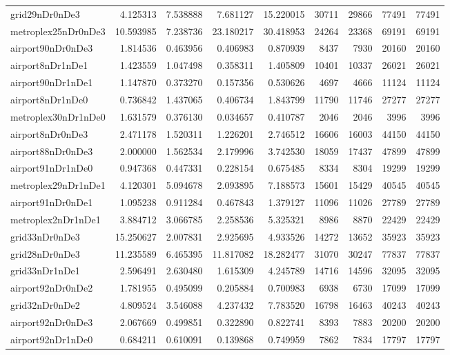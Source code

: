 \begin{longtable}{|l|r|r|r|r|r|r|r|r|}
grid29nDr0nDe3 & 4.125313 & 7.538888 & 7.681127 & 15.220015 & 30711 & 29866 & 77491 & 77491 \\
metroplex25nDr0nDe3 & 10.593985 & 7.238736 & 23.180217 & 30.418953 & 24264 & 23368 & 69191 & 69191 \\
airport90nDr0nDe3 & 1.814536 & 0.463956 & 0.406983 & 0.870939 & 8437 & 7930 & 20160 & 20160 \\
airport8nDr1nDe1 & 1.423559 & 1.047498 & 0.358311 & 1.405809 & 10401 & 10337 & 26021 & 26021 \\
airport90nDr1nDe1 & 1.147870 & 0.373270 & 0.157356 & 0.530626 & 4697 & 4666 & 11124 & 11124 \\
airport8nDr1nDe0 & 0.736842 & 1.437065 & 0.406734 & 1.843799 & 11790 & 11746 & 27277 & 27277 \\
metroplex30nDr1nDe0 & 1.631579 & 0.376130 & 0.034657 & 0.410787 & 2046 & 2046 & 3996 & 3996 \\
airport8nDr0nDe3 & 2.471178 & 1.520311 & 1.226201 & 2.746512 & 16606 & 16003 & 44150 & 44150 \\
airport88nDr0nDe3 & 2.000000 & 1.562534 & 2.179996 & 3.742530 & 18059 & 17437 & 47899 & 47899 \\
airport91nDr1nDe0 & 0.947368 & 0.447331 & 0.228154 & 0.675485 & 8334 & 8304 & 19299 & 19299 \\
metroplex29nDr1nDe1 & 4.120301 & 5.094678 & 2.093895 & 7.188573 & 15601 & 15429 & 40545 & 40545 \\
airport91nDr0nDe1 & 1.095238 & 0.911284 & 0.467843 & 1.379127 & 11096 & 11026 & 27789 & 27789 \\
metroplex2nDr1nDe1 & 3.884712 & 3.066785 & 2.258536 & 5.325321 & 8986 & 8870 & 22429 & 22429 \\
grid33nDr0nDe3 & 15.250627 & 2.007831 & 2.925695 & 4.933526 & 14272 & 13652 & 35923 & 35923 \\
grid28nDr0nDe3 & 11.235589 & 6.465395 & 11.817082 & 18.282477 & 31070 & 30247 & 77837 & 77837 \\
grid33nDr1nDe1 & 2.596491 & 2.630480 & 1.615309 & 4.245789 & 14716 & 14596 & 32095 & 32095 \\
airport92nDr0nDe2 & 1.781955 & 0.495099 & 0.205884 & 0.700983 & 6938 & 6730 & 17099 & 17099 \\
grid32nDr0nDe2 & 4.809524 & 3.546088 & 4.237432 & 7.783520 & 16798 & 16463 & 40243 & 40243 \\
airport92nDr0nDe3 & 2.067669 & 0.499851 & 0.322890 & 0.822741 & 8393 & 7883 & 20200 & 20200 \\
airport92nDr1nDe0 & 0.684211 & 0.610091 & 0.139868 & 0.749959 & 7862 & 7834 & 17797 & 17797 \\

\end{longtable}

